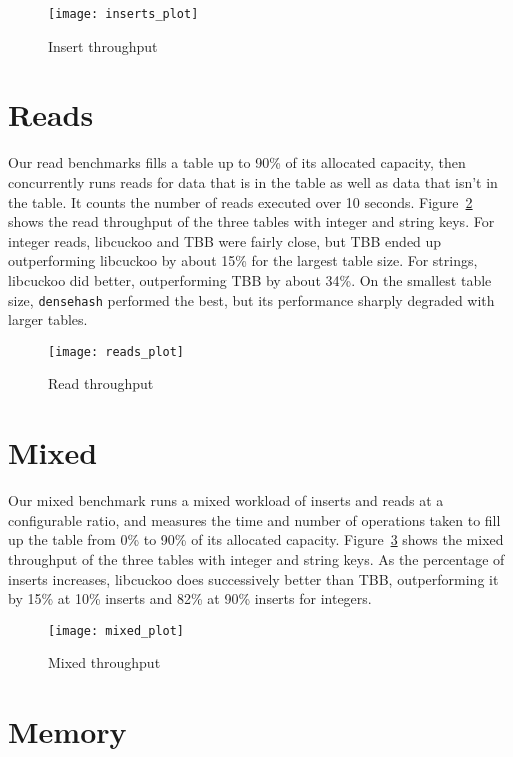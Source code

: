 \documentclass[12pt, letterpaper]{article}
\newcommand{\myfigwidth}{0.9\textwidth}
\newcommand{\densehash}{\texttt{dense\textunderscore hash}}
\begin{document}
\begin{figure}
  \centering
  \texttt{[image: inserts\_plot]}
  \caption{Insert throughput}
  \label{fig:inserts}
\end{figure}

\section{Reads}
\label{sec:reads}

Our read benchmarks fills a table up to 90\% of its allocated
capacity, then concurrently runs reads for data that is in the table
as well as data that isn't in the table. It counts the number of reads
executed over 10 seconds. Figure~\ref{fig:reads} shows the read
throughput of the three tables with integer and string keys. For
integer reads, libcuckoo and TBB were fairly close, but TBB ended up
outperforming libcuckoo by about 15\% for the largest table size. For
strings, libcuckoo did better, outperforming TBB by about 34\%. On the
smallest table size, {\densehash} performed the best, but its
performance sharply degraded with larger tables.

\begin{figure}
  \centering
  \texttt{[image: reads\_plot]}
  \caption{Read throughput}
  \label{fig:reads}
\end{figure}

\section{Mixed}
\label{sec:mixed}

Our mixed benchmark runs a mixed workload of inserts and reads at a
configurable ratio, and measures the time and number of operations
taken to fill up the table from 0\% to 90\% of its allocated capacity.
Figure~\ref{fig:mixed} shows the mixed throughput of the three tables
with integer and string keys. As the percentage of inserts increases,
libcuckoo does successively better than TBB, outperforming it by 15\%
at 10\% inserts and 82\% at 90\% inserts for integers.

\begin{figure}
  \centering
  \texttt{[image: mixed\_plot]}
  \caption{Mixed throughput}
  \label{fig:mixed}
\end{figure}

\section{Memory}
\label{sec:memory}
\end{document}
